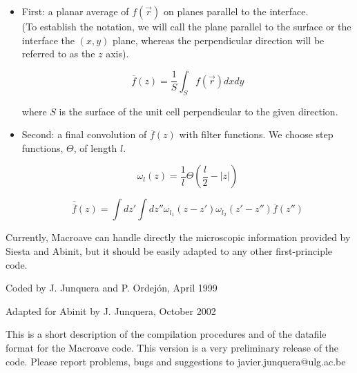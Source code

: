  \begin{itemize} 
    \item First: a planar average of $f \left( \vec{r} \right)$
          on planes parallel to the interface. \\
          (To establish the notation, we will call the plane parallel
          to the surface or the interface the $(x,y)$ plane, whereas the
          perpendicular direction will be referred to as
          the $z$ axis).

          \begin{equation}
             \overline{f} \left( z \right) =
             \frac{1}{S} \int_{S}
             f \left( \vec{r} \right) dx dy
             \label{eq:planar}
          \end{equation}

          \noindent where $S$ is the surface of the unit cell perpendicular 
                    to the given direction. 
     \item Second: a final convolution of $\overline{f} \left( z \right)$ 
           with filter functions. We choose 
           step functions, $\Theta$, of length $l$. 

            \begin{equation}
                \omega_{l} \left( z \right) 
                 = \frac{1}{l} \Theta\left( \frac{l}{2} - |z| \right)
                \label{eq:step}
            \end{equation}

             
            
            \begin{equation}
               \overline{ \overline{f}} \left( z \right) =
                       \int dz' \int dz'' \omega_{l_{1}} \left( z-z' \right)
                       \omega_{l_{2}} \left( z'-z'' \right)
                       \overline{f} \left( z'' \right)
               \label{eq:macro}
            \end{equation}
 \end{itemize} 

 Currently, {\sc Macroave} can handle directly the microscopic 
 information provided by {\sc Siesta} 
 and {\sc Abinit}, but it should be easily adapted to any other
 first-principle code. 

 Coded by J. Junquera and P. Ordej\'on, April 1999

 Adapted for {\sc Abinit} by J. Junquera, October 2002


 This is a short description of the compilation procedures
 and of the datafile format for the {\sc Macroave} code.
 This version is a very preliminary release of the code.
 Please report problems, bugs and suggestions to
 javier.junquera@ulg.ac.be

